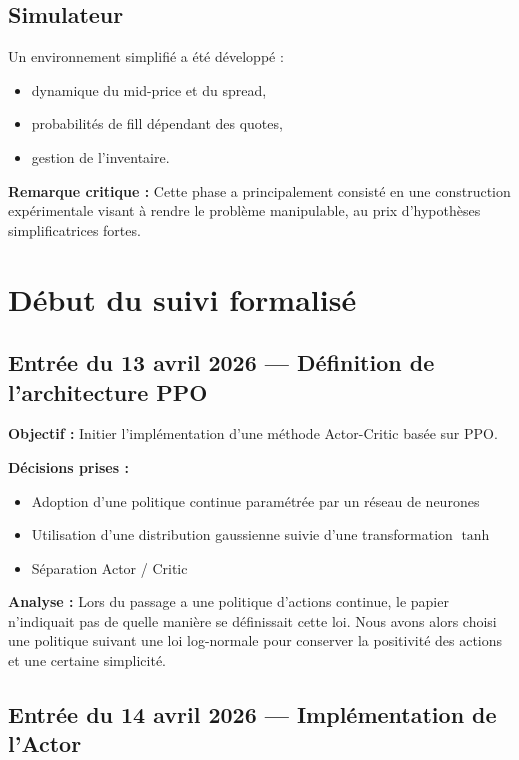 \documentclass[11pt,a4paper]{article}
\begin{document}
\subsection{Simulateur}

Un environnement simplifié a été développé :
\begin{itemize}
    \item dynamique du mid-price et du spread,
    \item probabilités de fill dépendant des quotes,
    \item gestion de l'inventaire.
\end{itemize}

\textbf{Remarque critique :}  
Cette phase a principalement consisté en une construction expérimentale visant à rendre le problème manipulable, au prix d'hypothèses simplificatrices fortes.

\section{Début du suivi formalisé}

\subsection*{Entrée du 13 avril 2026 --- Définition de l'architecture PPO}

\textbf{Objectif :}  
Initier l'implémentation d'une méthode Actor-Critic basée sur PPO.

\textbf{Décisions prises :}
\begin{itemize}
    \item Adoption d'une politique continue paramétrée par un réseau de neurones
    \item Utilisation d'une distribution gaussienne suivie d'une transformation $\tanh$
    \item Séparation Actor / Critic
\end{itemize}

\textbf{Analyse :}  
Lors du passage a une politique d'actions continue, le papier n'indiquait pas de quelle manière se définissait cette loi. 
Nous avons alors choisi une politique suivant une loi log-normale pour conserver la positivité des actions et une certaine simplicité. 

\subsection*{Entrée du 14 avril 2026 --- Implémentation de l'Actor}
\end{document}
